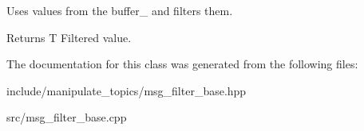Uses values from the buffer\+\_\+ and filters them.

\begin{DoxyReturn}{Returns}
T Filtered value. 
\end{DoxyReturn}


The documentation for this class was generated from the following files\+:\begin{DoxyCompactItemize}
\item 
include/manipulate\+\_\+topics/msg\+\_\+filter\+\_\+base.\+hpp\item 
src/msg\+\_\+filter\+\_\+base.\+cpp\end{DoxyCompactItemize}
